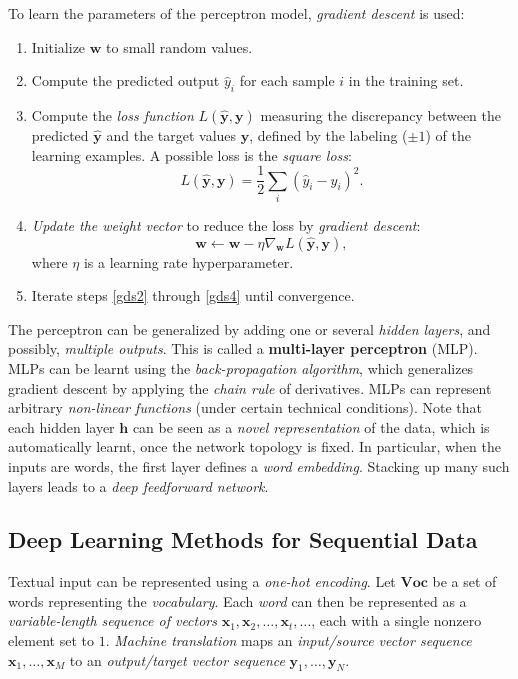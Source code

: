 To learn the parameters of the perceptron model, \emph{gradient descent} is used:
\begin{enumerate}
	\item Initialize \(\bm{w}\) to small random values.
	\item \label{gds2}Compute the predicted output \(\hat{y}_i\) for each sample \(i\) in the training set.
	\item Compute the \emph{loss function} \(L(\hat{\bm{y}}, \bm{y})\) measuring the discrepancy between the predicted \(\hat{\bm{y}}\) and the target values \(\bm{y}\), defined by the labeling (\(\pm 1\)) of the learning examples.
	A possible loss is the \emph{square loss}:
	\[
	L(\hat{\bm{y}}, \bm{y}) = \frac{1}{2}\sum_{i} (\hat{y}_i - y_i)^2.
	\]
	\item \label{gds4}\emph{Update the weight vector} to reduce the loss by \emph{gradient descent}:
	\[
	\bm{w} \gets \bm{w} - \eta \nabla_{\bm{w}} L(\hat{\bm{y}}, \bm{y}),
	\]
	where \(\eta\) is a learning rate hyperparameter.
	\item Iterate steps \ref{gds2} through \ref{gds4} until convergence.
\end{enumerate}

The perceptron can be generalized by adding one or several \emph{hidden layers}, and possibly, \emph{multiple outputs}.
This is called a \textbf{multi-layer perceptron} (MLP).
MLPs can be learnt using the \emph{back-propagation algorithm}, which generalizes gradient descent by applying the \emph{chain rule} of derivatives.
MLPs can represent arbitrary \emph{non-linear functions} (under certain technical conditions).
Note that each hidden layer \(\bm{h}\) can be seen as a \emph{novel representation} of the data, which is automatically learnt, once the network topology is fixed.
In particular, when the inputs are words, the first layer defines a \emph{word embedding}.
Stacking up many such layers leads to a \emph{deep feedforward network}.

\subsection{Deep Learning Methods for Sequential Data}
Textual input can be represented using a \emph{one-hot encoding}.
Let \(\mathbf{Voc}\) be a set of words representing the \emph{vocabulary}.
Each \emph{word} can then be represented as a \emph{variable-length sequence of vectors} \(\bm{x}_1, \bm{x}_2, \dots, \bm{x}_t, \dots\), each with a single nonzero element set to \(1\).
\emph{Machine translation} maps an \emph{input/source vector sequence} \(\bm{x}_1, \dots, \bm{x}_M\) to an \emph{output/target vector sequence} \(\bm{y}_1, \dots, \bm{y}_N\).

